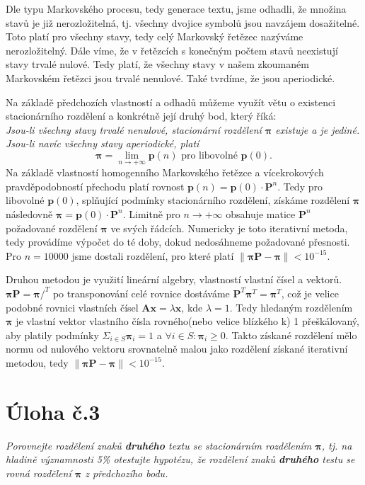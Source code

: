 \documentclass[czech]{mvi-report}
\begin{document}
Dle typu Markovského procesu, tedy generace textu, jsme odhadli, že množina stavů je již nerozložitelná, tj. všechny dvojice symbolů jsou navzájem dosažitelné. Toto platí pro všechny stavy, tedy celý Markovský řetězec nazýváme nerozložitelný. Dále víme, že v řetězcích s konečným počtem stavů neexistují stavy trvalé nulové. Tedy platí, že všechny stavy v našem zkoumaném Markovském řetězci jsou trvalé nenulové. Také tvrdíme, že jsou aperiodické.

Na základě předchozích vlastností a odhadů můžeme využít větu o existenci stacionárního rozdělení a konkrétně její druhý bod, který říká: \\
\textit{Jsou-li všechny stavy trvalé nenulové, stacionární rozdělení $ \bm{\pi} $ existuje a je jediné.}\\
\textit{Jsou-li navíc všechny stavy aperiodické, platí}
\begin{equation*}
\bm{\pi} = \lim_{n \to +\infty} \bm{p}(n) \textrm{ pro libovolné } \bm{p}(0).
\end{equation*}
Na základě vlastností homogenního Markovského řetězce a vícekrokových pravděpodobností přechodu platí rovnost $ \bm{p}(n) = \bm{p}(0) \cdot \textbf{P}^n $. Tedy pro libovolné $ \bm{p}(0) $, splňující podmínky stacionárního rozdělení, získáme rozdělení $ \bm{\pi} $ následovně $ \bm{\pi} = \bm{p}(0) \cdot \textbf{P}^n $. Limitně pro $ n \to +\infty $ obsahuje matice $ \textbf{P}^n $ požadované rozdělení $ \bm{\pi} $ ve svých řádcích. Numericky je toto iterativní metoda, tedy provádíme výpočet do té doby, dokud nedosáhneme požadované přesnosti. Pro $ n = 10000 $ jsme dostali rozdělení, pro které platí $ \|\bm{\pi}\textbf{P}-\bm{\pi}\| < 10^{-15} $.

Druhou metodou je využití lineární algebry, vlastností vlastní čísel a vektorů. $ \bm{\pi}\textbf{P}=\bm{\pi} /^T $ po transponování celé rovnice dostáváme $ \textbf{P}^T \bm{\pi}^T = \bm{\pi}^T $, což je velice podobné rovnici vlastních čísel $ \textbf{A}\bm{x} = \lambda \bm{x} $, kde $ \lambda = 1 $. Tedy hledaným rozdělením $ \bm{\pi} $ je vlastní vektor vlastního čísla rovného(nebo velice blízkého k) 1 přeškálovaný, aby platily podmínky $ \Sigma_{i \in S} \bm{\pi}_i = 1 $ a $ \forall i \in S: \bm{\pi}_i \geq 0 $. Takto získané rozdělení mělo normu od nulového vektoru srovnatelně malou jako rozdělení získané iterativní metodou, tedy $ \|\bm{\pi}\textbf{P}-\bm{\pi}\| < 10^{-15} $.

\section{Úloha č.3}
\textit{Porovnejte rozdělení znaků  \textbf{druhého} textu se stacionárním rozdělením $ \bm{\pi} $, tj. na hladině významnosti 5\% otestujte hypotézu, že rozdělení znaků \textbf{druhého} testu se rovná rozdělení $ \bm{\pi} $ z předchozího bodu.}\\
\end{document}
